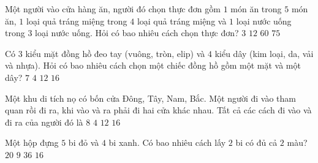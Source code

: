 \begin{ex}%
	Một người vào cửa hàng ăn, người đó chọn thực đơn gồm $1$ món ăn trong $5$ món ăn, $1$ loại quả tráng miệng trong $4$ loại quả tráng miệng và $1$ loại nước uống trong $3$ loại nước uống. Hỏi có bao nhiêu cách chọn thực  đơn?
	 \choice
		{$3$} 
		{$12$} 
		{\True  $60$}
		{$75$} 
\end{ex}

\begin{ex}%
	 Có $3$ kiểu mặt đồng hồ đeo tay (vuông, tròn, elip) và $4$ kiểu dây (kim loại, da, vải và nhựa). Hỏi có bao nhiêu cách chọn một chiếc đồng hồ gồm một mặt và một dây?
	 \choice
		 {$7$}
		{$4$} 
		 {\True $12$}
		{$16$} 
\end{ex}

\begin{ex}%
	Một khu di tích nọ có bốn cửa Đông, Tây, Nam, Bắc. Một người đi vào tham quan rồi đi ra, khi vào và ra phải đi hai cửa khác nhau. Tất cả các  cách đi vào và đi ra của người đó là
	 \choice
		 {$8$}
		{$4$} 
		 {\True $12$}
		 {$16$}
\end{ex}

\begin{ex}%
	 Một hộp đựng $5$ bi đỏ và $4$ bi xanh. Có bao nhiêu cách lấy $2$ bi có đủ cả $2$ màu?
	 \choice
		{\True $20$} 
		 {$9$}
		 {$36$}
		 {$16$}
\end{ex}


